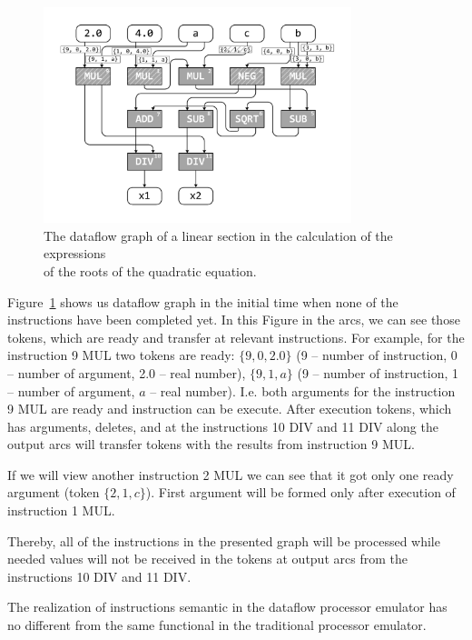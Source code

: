 \documentclass[
11pt,%
tightenlines,%
twoside,%
onecolumn,%
nofloats,%
nobibnotes,%
nofootinbib,%
superscriptaddress,%
noshowpacs,%
centertags]%
{revtex4}
\begin{document}
\begin{figure}[h]
\setcaptionmargin{5mm}
\onelinecaptionsfalse %
\includegraphics[width=0.80\textwidth]{pics/dataflow.pdf}
\caption{The dataflow graph of a linear section in the calculation of the expressions \\ of the roots of the quadratic equation.}\label{fig:dataflow}
\end{figure}

Figure~\ref{fig:dataflow} shows us dataflow graph in the initial time when none of the instructions have been completed yet. In this Figure in the arcs, we can see those tokens, which are ready and transfer at relevant instructions. For example, for the instruction 9 MUL two tokens are ready: $\{9, 0, 2.0\}$ (9 -- number of instruction, 0 -- number of argument, 2.0 -- real number), $\{9, 1, a\}$ (9 -- number of instruction, 1 -- number of argument, $a$ -- real number). I.e. both arguments for the instruction 9 MUL are ready and instruction can be execute. After execution tokens, which has arguments, deletes, and at the instructions 10 DIV and 11 DIV along the output arcs will transfer tokens with the results from instruction 9 MUL.

If we will view another instruction 2 MUL we can see that it got only one ready argument (token $\{2, 1, c\}$). First argument will be formed only after execution of instruction 1 MUL.

Thereby, all of the instructions in the presented graph will be processed while needed values will not be received in the tokens at output arcs from the instructions 10 DIV and 11 DIV.

The realization of instructions semantic in the dataflow processor emulator has no different from the same functional in the traditional processor emulator.
\end{document}
